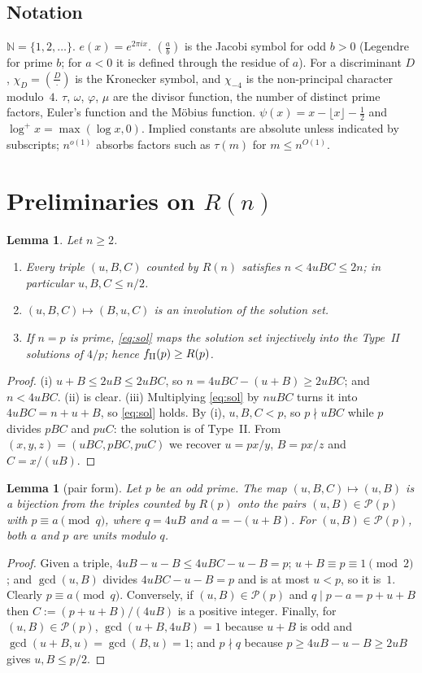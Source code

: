 \documentclass[11pt,reqno]{amsart}
\newtheorem{lemma}[theorem]{Lemma}
\theoremstyle{definition}
\newcommand{\N}{\mathbb N}
\newcommand{\leg}[2]{\left(\frac{#1}{#2}\right)}
\newcommand{\cP}{\mathcal P}
\begin{document}
\subsection{Notation}
$\N=\{1,2,\dots\}$.  $e(x)=e^{2\pi ix}$.  $\leg{a}{b}$ is the Jacobi
symbol for odd $b>0$ (Legendre for prime $b$; for $a<0$ it is defined
through the residue of $a$).  For a discriminant $D$, $\chi_D=\leg D\cdot$
is the Kronecker symbol, and $\chi_{-4}$ is the non-principal character
modulo~$4$.  $\tau$, $\omega$, $\varphi$, $\mu$ are the divisor function,
the number of distinct prime factors, Euler's function and the M\"obius
function.  $\psi(x)=x-\lfloor x\rfloor-\frac12$ and $\log^+x=\max(\log x,0)$.
Implied constants are absolute unless indicated
by subscripts; $n^{o(1)}$ absorbs factors such as $\tau(m)$ for
$m\le n^{O(1)}$.

\section{Preliminaries on $R(n)$}\label{sec:prelim}

\begin{lemma}\label{lem:basic}
Let $n\ge2$.
\begin{enumerate}
\item[(i)] Every triple $(u,B,C)$ counted by $R(n)$ satisfies
$n<4uBC\le 2n$; in particular $u,B,C\le n/2$.
\item[(ii)] $(u,B,C)\mapsto(B,u,C)$ is an involution of the solution set.
\item[(iii)] If $n=p$ is prime, \eqref{eq:sol} maps the solution set
injectively into the Type~II solutions of $4/p$; hence
$f_{\rm II}(p)\ge R(p)$.
\end{enumerate}
\end{lemma}
\begin{proof}
(i) $u+B\le 2uB\le 2uBC$, so $n=4uBC-(u+B)\ge 2uBC$; and $n<4uBC$.
(ii) is clear.  (iii) Multiplying \eqref{eq:sol} by $nuBC$ turns it into
$4uBC=n+u+B$, so \eqref{eq:sol} holds.  By (i),
$u,B,C<p$, so $p\nmid uBC$ while $p$ divides $pBC$ and $puC$: the
solution is of Type~II.  From $(x,y,z)=(uBC,pBC,puC)$ we recover
$u=px/y$, $B=px/z$ and $C=x/(uB)$.
\end{proof}

\begin{lemma}[pair form]\label{lem:pair}
Let $p$ be an odd prime.  The map $(u,B,C)\mapsto(u,B)$ is a bijection
from the triples counted by $R(p)$ onto the pairs $(u,B)\in\cP(p)$ with
$p\equiv a\pmod q$, where $q=4uB$ and $a=-(u+B)$.  For $(u,B)\in\cP(p)$,
both $a$ and $p$ are units modulo $q$.
\end{lemma}
\begin{proof}
Given a triple, $4uB-u-B\le 4uBC-u-B=p$; $u+B\equiv p\equiv 1\pmod 2$;
and $\gcd(u,B)$ divides $4uBC-u-B=p$ and is at most $u<p$, so it is~$1$.
Clearly $p\equiv a\pmod q$.  Conversely, if $(u,B)\in\cP(p)$ and $q\mid
p-a=p+u+B$ then $C:=(p+u+B)/(4uB)$ is a positive integer.  Finally, for $(u,B)\in\cP(p)$,
$\gcd(u+B,4uB)=1$ because $u+B$ is odd and $\gcd(u+B,u)=\gcd(B,u)=1$; and
$p\nmid q$ because $p\ge4uB-u-B\ge2uB$ gives $u,B\le p/2$.
\end{proof}
\end{document}
